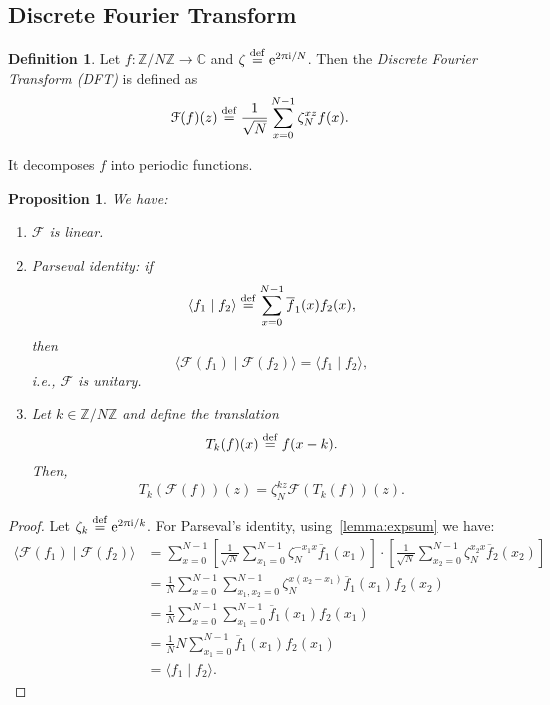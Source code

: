\documentclass[12pt]{amsart}
\theoremstyle{plain}
\newtheorem{proposition}[theorem]{Proposition}
\theoremstyle{definition}
\newtheorem{definition}[theorem]{Definition}
\theoremstyle{remarks}
\newcommand{\Z}{\mathbb{Z}}
\newcommand{\C}{\mathbb{C}}
\newcommand{\me}{\mathrm{e}}
\newcommand{\mi}{\mathrm{i}}
\newcommand{\mpi}{\uppi}
\newcommand{\idef}{\overset{{\rm def}}{=}}
\renewcommand{\bar}{\overline}
\newcommand{\ft}{\mathcal{F}}  %
\begin{document}
\subsection{Discrete Fourier Transform}

\begin{definition}
  Let $f : \Z/{N}\Z \to \C$ and $\zeta \idef \me^{2\mpi\mi/N}$.  Then the \emph{Discrete Fourier Transform (DFT)} is defined as
  \[
    \ft(f)(z) \idef \frac{1}{\sqrt{N}} \sum_{x=0}^{N-1} \zeta_N^{xz} f(x).
  \]
\end{definition}

It decomposes $f$ into periodic functions.


\begin{proposition}
  We have:
  \begin{enumerate}

  \item $\ft$ is linear.

  \item \emph{Parseval identity}: if
    \[
      \langle f_1 \mid f_2 \rangle \idef \sum_{x=0}^{N-1} \bar{f}_1(x) f_2(x),
    \]
    then
    \[
      \langle \ft(f_1) \mid \ft(f_2) \rangle = \langle f_1 \mid f_2 \rangle,
    \]
    i.e., $\ft$ is unitary.

  \item Let $k \in \Z/{N}\Z$ and define the translation
    \[
      T_k(f)(x) \idef f(x - k).
    \]
    Then,
    \[
      T_k(\ft(f))(z) = \zeta_N^{kz} \ft(T_k(f))(z).
    \]

  \end{enumerate}
\end{proposition}

\begin{proof}
  Let $\zeta_k \idef \me^{2 \mpi \mi/k}$.   For Parseval's identity, using~\vref{lemma:expsum} we have:
  \begin{align*}
    \langle \ft(f_1) \mid \ft(f_2) \rangle
    &= \sum_{x=0}^{N-1} \left[ \frac{1}{\sqrt{N}} \sum_{x_1=0}^{N-1} \zeta_N^{-x_1x} \bar{f}_1(x_1)\right] \cdot \left[ \frac{1}{\sqrt{N}} \sum_{x_2=0}^{N-1} \zeta_N^{x_2x} \bar{f}_2(x_2)\right] \\
    &= \frac{1}{N} \sum_{x=0}^{N-1} \sum_{x_1, x_2=0}^{N-1} \zeta_N^{x(x_2 - x_1)} \bar{f}_1(x_1) f_2(x_2) \\
    &= \frac{1}{N} \sum_{x=0}^{N-1} \sum_{x_1=0}^{N-1} \bar{f}_1(x_1) f_2(x_1) \\
    &= \frac{1}{N} N \sum_{x_1=0}^{N-1} \bar{f}_1(x_1) f_2(x_1) \\
    &= \langle f_1 \mid f_2 \rangle.
  \end{align*}
\end{proof}
\end{document}
